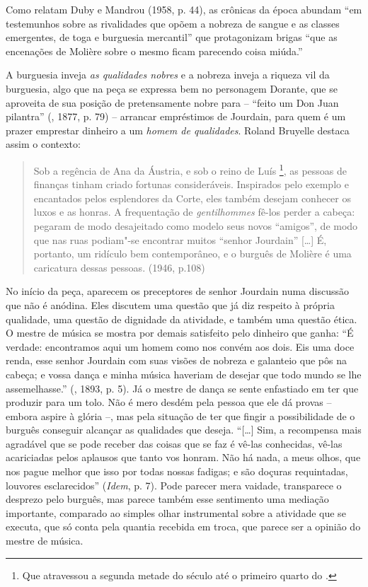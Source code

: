 Como relatam Duby e Mandrou (1958, p. 44), as crônicas da época abundam
``em testemunhos sobre as rivalidades que opõem a nobreza de sangue e as
classes emergentes, de toga e burguesia mercantil'' que protagonizam
brigas ``que as encenações de Molière sobre o mesmo ficam parecendo
coisa miúda.''

A burguesia inveja \emph{as qualidades nobres} e a nobreza inveja a
riqueza vil da burguesia, algo que na peça se expressa bem no personagem
Dorante, que se aproveita de sua posição de pretensamente nobre para --
``feito um Don Juan pilantra'' (, 1877, p. 79) -- arrancar
empréstimos de Jourdain, para quem é um prazer emprestar dinheiro a um
\emph{homem de qualidades}. Roland Bruyelle destaca assim o contexto:

\begin{quote}
Sob a regência de Ana da Áustria, e sob o reino de Luís \footnote{Que
  atravessou a segunda metade do século  até o primeiro quarto do
  .}, as pessoas de finanças tinham criado fortunas consideráveis.
Inspirados pelo exemplo e encantados pelos esplendores da Corte, eles
também desejam conhecer os luxos e as honras. A frequentação de
\emph{gentilhommes} fê-los perder a cabeça: pegaram de modo desajeitado
como modelo seus novos ``amigos'', de modo que nas ruas podiam"-se
encontrar muitos ``senhor Jourdain'' [\ldots{}] É, portanto, um
ridículo bem contemporâneo, e o burguês de Molière é uma caricatura
dessas pessoas. (1946, p.108)
\end{quote}

No início da peça, aparecem os preceptores de senhor Jourdain numa
discussão que não é anódina. Eles discutem uma questão que já diz
respeito à própria qualidade, uma questão de dignidade da atividade, e
também uma questão ética. O mestre de música se mostra por demais
satisfeito pelo dinheiro que ganha: ``É verdade: encontramos aqui um
homem como nos convém aos dois. Eis uma doce renda, esse senhor Jourdain
com suas visões de nobreza e galanteio que pôs na cabeça; e vossa dança
e minha música haveriam de desejar que todo mundo se lhe assemelhasse.''
(, 1893, p. 5). Já o mestre de dança se sente enfastiado em ter
que produzir para um tolo. Não é mero desdém pela pessoa que ele dá
provas -- embora aspire à glória --, mas pela situação de ter que fingir
a possibilidade de o burguês conseguir alcançar as qualidades que
deseja. ``[\ldots{}] Sim, a recompensa mais agradável que se pode receber
das coisas que se faz é vê-las conhecidas, vê-las acariciadas pelos
aplausos que tanto vos honram. Não há nada, a meus olhos, que nos pague
melhor que isso por todas nossas fadigas; e são doçuras requintadas,
louvores esclarecidos'' (\emph{Idem}, p. 7). Pode parecer mera vaidade,
transparece o desprezo pelo burguês, mas parece também esse sentimento
uma mediação importante, comparado ao simples olhar instrumental sobre a
atividade que se executa, que só conta pela quantia recebida em troca,
que parece ser a opinião do mestre de música.

